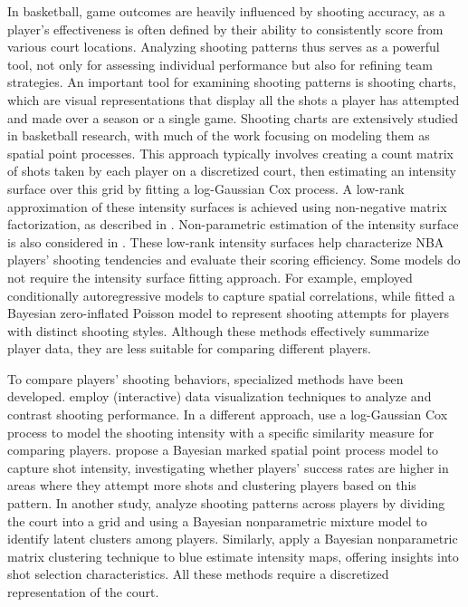 \documentclass[USenglish]{article}
\theoremstyle{dgthm}
\theoremstyle{dgdef}
\begin{document}
In basketball, game outcomes are heavily influenced by shooting accuracy, as a player's effectiveness is often defined by their ability to consistently score from various court locations. 
Analyzing shooting patterns thus serves as a powerful tool, not only for assessing individual performance but also for refining team strategies. An important tool for examining shooting patterns is shooting charts, which are visual representations that display all the shots a player has attempted and made over a season or a single game. Shooting charts are extensively studied in basketball research, with much of the work focusing on modeling them as spatial point processes. This approach typically involves creating a count matrix of shots taken by each player on a discretized court, then estimating an intensity surface over this grid by fitting a log-Gaussian Cox process. A low-rank approximation of these intensity surfaces is achieved using non-negative matrix factorization, as described in \citet{millerFactorizedPointProcess2014,franksCharacterizingSpatialStructure2015}. Non-parametric estimation of the intensity surface is also considered in \cite{yinBayesianNonparametricLearning2022}. These low-rank intensity surfaces help characterize NBA players’ shooting tendencies and evaluate their scoring efficiency. Some models do not require the intensity surface fitting approach. For example, \cite{reichSpatialAnalysisBasketball2006} employed conditionally autoregressive models to capture spatial correlations, while \cite{huZeroinflatedPoissonModel2023} fitted a Bayesian zero-inflated Poisson model to represent shooting attempts for players with distinct shooting styles. Although these methods effectively summarize player data, they are less suitable for comparing different players.


To compare players' shooting behaviors, specialized methods have been developed. \citet{fuHoopInSightAnalyzingComparing2024} employ (interactive) data visualization techniques to analyze and contrast shooting performance. In a different approach, \citet{huBayesianGroupLearning2021} use a log-Gaussian Cox process to model the shooting intensity with a specific similarity measure for comparing players. \citet{jiaoBayesianMarkedSpatial2021} propose a Bayesian marked spatial point process model to capture shot intensity, investigating whether players’ success rates are higher in areas where they attempt more shots and clustering players based on this pattern. In another study, \citet{wong-toiJointAnalysisField2022} analyze shooting patterns across players by dividing the court into a grid and using a Bayesian nonparametric mixture model to identify latent clusters among players. Similarly, \citet{yinAnalysisProfessionalBasketball2023} apply a Bayesian nonparametric matrix clustering technique to blue estimate intensity maps, offering insights into shot selection characteristics. All these methods require a discretized representation of the court.
\end{document}
